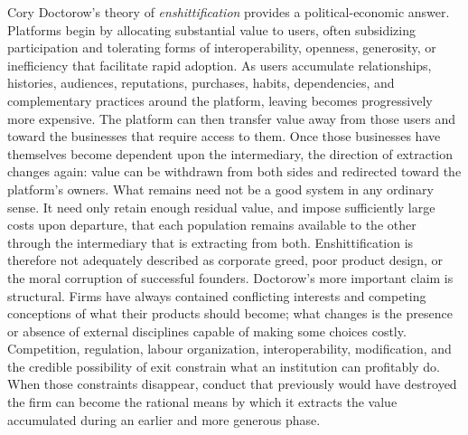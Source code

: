 \documentclass[11pt]{article}
\begin{document}
Cory Doctorow's theory of \emph{enshittification} \parencite{doctorow2023enshittification,doctorow2024enshittification,doctorowgiblin2022chokepoint} provides a political-economic answer. Platforms begin by allocating substantial value to users, often subsidizing participation and tolerating forms of interoperability, openness, generosity, or inefficiency that facilitate rapid adoption. As users accumulate relationships, histories, audiences, reputations, purchases, habits, dependencies, and complementary practices around the platform, leaving becomes progressively more expensive. The platform can then transfer value away from those users and toward the businesses that require access to them. Once those businesses have themselves become dependent upon the intermediary, the direction of extraction changes again: value can be withdrawn from both sides and redirected toward the platform's owners. What remains need not be a good system in any ordinary sense. It need only retain enough residual value, and impose sufficiently large costs upon departure, that each population remains available to the other through the intermediary that is extracting from both. Enshittification is therefore not adequately described as corporate greed, poor product design, or the moral corruption of successful founders. Doctorow's more important claim is structural. Firms have always contained conflicting interests and competing conceptions of what their products should become; what changes is the presence or absence of external disciplines capable of making some choices costly. Competition, regulation, labour organization, interoperability, modification, and the credible possibility of exit constrain what an institution can profitably do. When those constraints disappear, conduct that previously would have destroyed the firm can become the rational means by which it extracts the value accumulated during an earlier and more generous phase.
\end{document}
